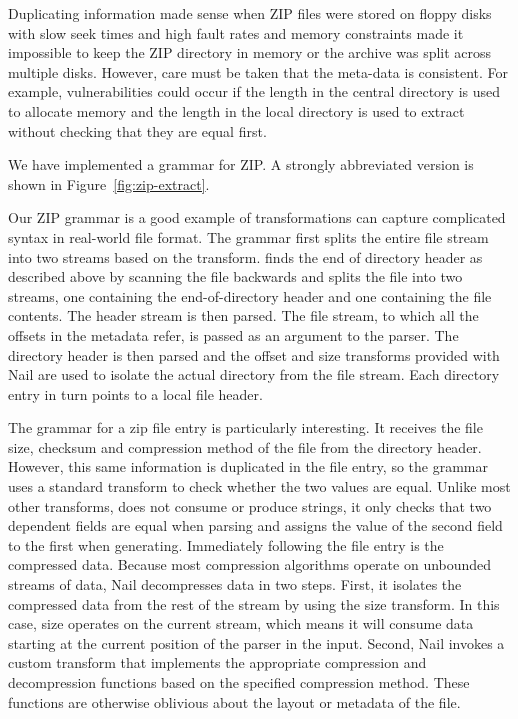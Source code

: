 Duplicating information made sense when ZIP files were
stored on floppy disks with slow seek times and high fault rates and memory constraints made it
impossible to keep the ZIP directory in memory or the archive was split across multiple disks.
However, care must be taken that the meta-data is consistent. For example, vulnerabilities could occur
if the length in the central directory is used to allocate memory and the length in the local
directory is used to extract without checking that they are equal first. 

We have implemented a grammar for ZIP. A strongly abbreviated version is shown in
Figure~\ref{fig:zip-extract}.

Our ZIP grammar is a good example of transformations can capture complicated syntax in real-world
file format. The  grammar first splits the entire file stream into two streams
based on the  transform.
finds the end of directory header as described above by scanning the file backwards and splits the
file into two streams, one containing the end-of-directory header and one containing the file
contents. The header stream is then parsed. The file stream, to which all the offsets in the
metadata refer, is passed as an argument to the  parser.
The directory header is then parsed and the offset and size transforms provided with Nail are used
to isolate the actual directory from the file stream. Each directory entry in turn points to a local
file header. 

The  grammar for a zip file entry is particularly interesting. It receives the file
size, checksum and compression method of the file from the directory header. However, this same
information is duplicated in the file entry, so the grammar uses a standard 
transform to check whether the two values are equal. Unlike most other transforms, 
does not consume or produce strings, it only checks that two dependent fields are equal when parsing
and assigns the value of the second field to the first when generating. Immediately following the
file entry is the compressed data. Because most compression algorithms operate on unbounded streams
of data, Nail decompresses data in two steps.
First, it isolates the compressed data from the rest of the stream by using the size transform. In
this case, size operates on the current stream, which means it will consume data starting at the
current position of the parser in the input.
Second, Nail invokes a custom transform that implements the appropriate compression and decompression
functions based on the specified compression method. These functions are otherwise oblivious about
the layout or metadata of the file.

